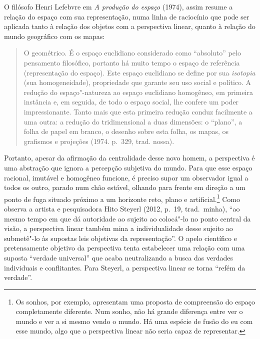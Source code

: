 O filósofo Henri Lefebvre em \emph{A produção do espaço} (1974), assim
resume a relação do espaço com sua representação, numa linha de
raciocínio que pode ser aplicada tanto à relação dos objetos com a
perspectiva linear, quanto à relação do mundo geográfico com os mapas:

\begin{quote}
O geométrico. É o espaço euclidiano considerado como ``absoluto'' pelo
pensamento filosófico, portanto há muito tempo o espaço de referência
(representação do espaço). Este espaço euclidiano se define por sua
\emph{isotopia} (sua homogeneidade), propriedade que garante seu uso
social e político. A redução do espaço"-natureza ao espaço euclidiano
homogêneo, em primeira instância e, em seguida, de todo o espaço social,
lhe confere um poder impressionante. Tanto mais que esta primeira
redução conduz facilmente a uma outra: a redução do tridimensional a
duas dimensões: o ``plano'', a folha de papel em branco, o desenho sobre
esta folha, os mapas, os grafismos e projeções (1974. p.~329, trad.
nossa).
\end{quote}

Portanto, apesar da afirmação da centralidade desse novo homem, a
perspectiva é uma abstração que ignora a percepção subjetiva do mundo.
Para que esse espaço racional, imutável e homogêneo funcione, é preciso
supor um observador igual a todos os outro, parado num chão estável,
olhando para frente em direção a um ponto de fuga situado próximo a um
horizonte reto, plano e artificial.\footnote{Os sonhos, por exemplo, apresentam uma proposta de compreensão do espaço completamente diferente. Num sonho, não há grande diferença entre ver o mundo e ver a si mesmo vendo o mundo. Há uma espécie de fusão do eu com esse mundo, algo que a perspectiva linear não seria capaz de representar.} Como observa a artista e
pesquisadora Hito Steyerl (2012, p.~19, trad.~minha), ``ao mesmo tempo
em que dá autoridade ao sujeito ao colocá"-lo no ponto central da visão,
a perspectiva linear também mina a individualidade desse sujeito ao
submetê"-lo às supostas leis objetivas da representação''. O apelo
científico e pretensamente objetivo da perspectiva tenta estabelecer uma
relação com uma suposta ``verdade universal'' que acaba neutralizando a
busca das verdades individuais e conflitantes. Para Steyerl, a
perspectiva linear se torna ``refém da verdade''.

